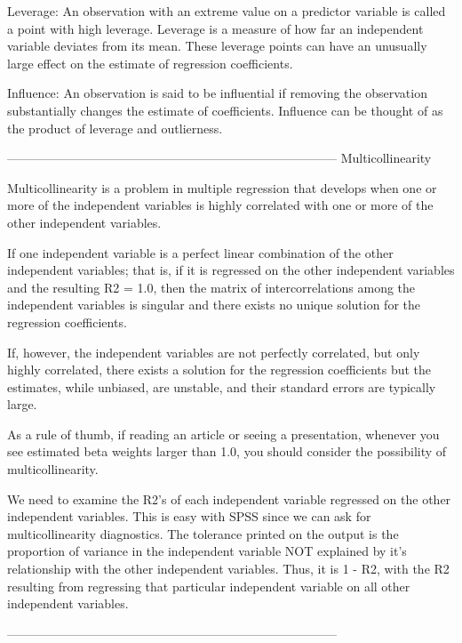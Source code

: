  

Leverage: An observation with an extreme value on a predictor variable is called a point with high leverage. Leverage is a measure of how far an independent variable deviates from its mean. These leverage points can have an unusually large effect on the estimate of regression coefficients.

 

Influence: An observation is said to be influential if removing the observation substantially changes the estimate of coefficients. Influence can be thought of as the product of leverage and outlierness.

 


--------------------------------------------------------------------------------
Multicollinearity 

Multicollinearity is a problem in multiple regression that develops when one or more of the independent variables is highly correlated with one or more of the other independent variables. 


If one independent variable is a perfect linear combination of the other independent variables; that is, if it is regressed on the other independent variables and the resulting R2 = 1.0, then the matrix of intercorrelations among the independent variables is singular and there exists no unique solution for the regression coefficients.


If, however, the independent variables are not perfectly correlated, but only highly correlated, there exists a solution for the regression coefficients but the estimates, while unbiased, are unstable, and their standard errors are typically large. 


As a rule of thumb, if reading an article or seeing a presentation, whenever you see estimated beta weights larger than 1.0, you should consider the possibility of multicollinearity.


We need to examine the R2's of each independent variable regressed on the other independent variables. This is easy with SPSS since we can ask for multicollinearity diagnostics. The tolerance printed on the output is the proportion of variance in the independent variable NOT explained by it's relationship with the other independent variables. Thus, it is 1 - R2, with the R2 resulting from regressing that particular independent variable on all other independent variables.




--------------------------------------------------------------------------------
 
